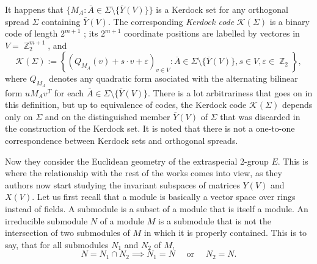 \documentclass[a4paper]{article}
\DeclareMathOperator{\Z}{\mathbb{Z}}
\begin{document}
  It happens that $\{M_A : \overline{A} \in \Sigma \setminus
  \{\overline{Y}(V)\}\}$ is a Kerdock set for any orthogonal
  spread $\Sigma$ containing $\overline{Y}(V)$. The
  corresponding \textit{Kerdock code} $\mathcal K(\Sigma)$ 
  is a binary code of length $2^{m+1}$ ; its $2^{m+1}$ 
  coordinate positions are labelled by vectores in $V =
  \Z_2^{m+1}$, and
  \begin{equation}
    \mathcal K(\Sigma)
    := \left\{
      \left( Q_{M_A}(v) + s \cdot v + \varepsilon \right)_{v
      \in V} : \overline{A} \in \Sigma \setminus
      \{\overline{Y}(V)\}, s \in V, \varepsilon \in \Z_2
    \right\},
  \end{equation}
  where $Q_{M_A}$ denotes any quadratic form asociated with
  the alternating bilinear form $u M_A v^{T}$ for each
  $\overline{A} \in \Sigma \setminus \{\overline{Y}(V)\}$.
  There is a lot arbitrariness that goes on in this
  definition, but up to equivalence of codes, the Kerdock
  code $\mathcal K(\Sigma)$ depends only on $\Sigma$ and on
  the distinguished member $\overline{Y}(V)$ of $\Sigma$ 
  that was discarded in the construction of the Kerdock set.
  It is noted that there is not a one-to-one correspondence
  between Kerdock sets and orthogonal spreads.

  Now they consider the Euclidean geometry of the
  extraspecial 2-group $E$. This is where the relationship
  with the rest of the works comes into view, as they
  authors now start studying the invariant subspaces of
  matrices $Y(V)$ and $X(V)$. Let us first recall that a
  module is basically a vector space over rings instead of
  fields. A submodule is a subset of a module that is
  itself a module. An irreducible submodule $N$ of a module
  $M$ is a submodule that is not the intersection of two
  submodules of $M$ in which it is properly contained. This
  is to say, that for all submodules $N_1$ and $N_2$ of $M$,
  \[
    N = N_1 \cap N_2 \implies N_1 = N \quad \text{ or }
    \quad N_2 = N.
  \] 
\end{document}
